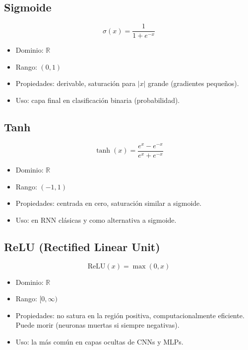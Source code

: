 \documentclass[12pt,a4paper,openany,oneside]{book}
\begin{document}
\subsection{Sigmoide}
\begin{equation*}
\sigma(x) = \frac{1}{1 + e^{-x}}
\end{equation*}
\begin{itemize}
    \item Dominio: $\mathbb{R}$
    \item Rango: $(0,1)$
    \item Propiedades: derivable, saturación para $|x|$ grande (gradientes pequeños).
    \item Uso: capa final en clasificación binaria (probabilidad).
\end{itemize}

\subsection{Tanh}
\begin{equation*}
\tanh(x) = \frac{e^x - e^{-x}}{e^x + e^{-x}}
\end{equation*}
\begin{itemize}
    \item Dominio: $\mathbb{R}$
    \item Rango: $(-1,1)$
    \item Propiedades: centrada en cero, saturación similar a sigmoide.
    \item Uso: en RNN clásicas y como alternativa a sigmoide.
\end{itemize}

\subsection{ReLU (Rectified Linear Unit)}
\begin{equation*}
\text{ReLU}(x) = \max(0, x)
\end{equation*}
\begin{itemize}
    \item Dominio: $\mathbb{R}$
    \item Rango: $[0, \infty)$
    \item Propiedades: no satura en la región positiva, computacionalmente eficiente. Puede morir (neuronas muertas si siempre negativas).
    \item Uso: la más común en capas ocultas de CNNs y MLPs.
\end{itemize}
\end{document}
